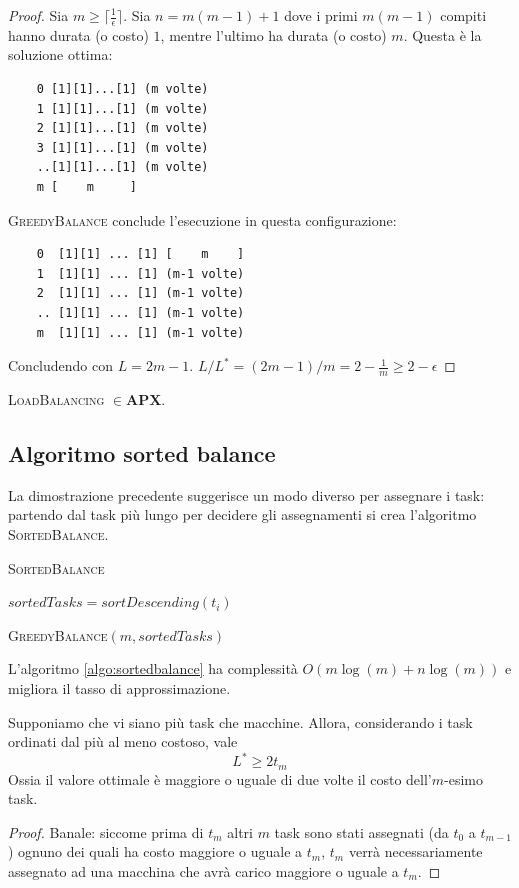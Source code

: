 \begin{proof}
	Sia $m \geq \lceil\frac{1}{\epsilon}\rceil$. Sia $n = m(m-1) + 1$ dove i
	primi $m(m-1)$ compiti hanno durata (o costo) $1$, mentre l'ultimo ha durata
	(o costo) $m$.
	Questa è la soluzione ottima:
	\begin{lstlisting}
    0 [1][1]...[1] (m volte) 
    1 [1][1]...[1] (m volte)   
    2 [1][1]...[1] (m volte) 
    3 [1][1]...[1] (m volte)   
    ..[1][1]...[1] (m volte)  
    m [    m     ]
\end{lstlisting}
	\textsc{GreedyBalance} conclude l'esecuzione in questa configurazione:
	\begin{lstlisting}
    0  [1][1] ... [1] [    m    ]
    1  [1][1] ... [1] (m-1 volte) 
    2  [1][1] ... [1] (m-1 volte) 
    .. [1][1] ... [1] (m-1 volte)
    m  [1][1] ... [1] (m-1 volte)
\end{lstlisting}
	Concludendo con $L = 2m -1$. $L/{L^*} =  (2m-1)/m = 2 - \frac{1}{m} \geq 2 - \epsilon$
\end{proof}

\begin{corollario}
	\textsc{LoadBalancing} $ \in  \mathbf{APX}$.
\end{corollario}

\subsection{Algoritmo sorted balance}
La dimostrazione precedente suggerisce un modo diverso per assegnare i task:
partendo dal task più lungo per decidere gli assegnamenti si crea l'algoritmo
\textsc{SortedBalance}.
\begin{algorithm}
	\caption{\textsc{SortedBalance}}
	\label{algo:sortedbalance}

	$sortedTasks = sortDescending(t_i)$

	\textsc{GreedyBalance}$(m, sortedTasks)$

\end{algorithm}
L'algoritmo \ref{algo:sortedbalance} ha complessità $O(m\log(m) + n\log(m))$ e
migliora il tasso di approssimazione.

\begin{lemma}\label{lem:lbal_l_gt_t_m}
	Supponiamo che vi siano più task che macchine. Allora, considerando i task
	ordinati dal più al meno costoso, vale
	$$
		L^* \geq 2 t_m
	$$
	Ossia il valore ottimale è maggiore o uguale di due volte il costo dell'$m$-esimo
	task.
\end{lemma}
\begin{proof}
	Banale: siccome prima di $t_m$ altri $m$ task sono stati assegnati (da $t_0$ a $t_{m-1}$)
	ognuno dei quali ha costo maggiore o uguale a $t_m$, $t_m$ verrà necessariamente
	assegnato ad una macchina che avrà carico maggiore o uguale a $t_m$.
\end{proof}


